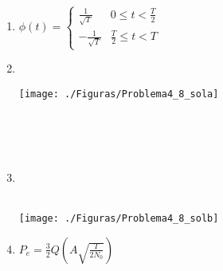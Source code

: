 \documentclass[idioma,boletin]{uah}
\begin{document}
{

\begin{enumerate}
	\item $\phi(t) = \left \{ \begin{array}{ll} \frac{1}{\sqrt{T}} & 0 \leq t < \frac{T}{2} \\  -\frac{1}{\sqrt{T}} & \frac{T}{2} \leq t < T \end{array} \right.$
	
	\item \ \\
	\begin{figure*}[h!] \centering\texttt{[image: ./Figuras/Problema4\_8\_sola]}	\end{figure*}
	\ \\
	\ \\
	\ \\
	\item \ \\
	\ \\
	\begin{figure*}[h!] 	\centering\texttt{[image: ./Figuras/Problema4\_8\_solb]} 	\end{figure*}
	
	\item $P_e = \frac{3}{2} Q \left ( A \sqrt{\frac{T}{2N_0}} \right ) $
\end{enumerate}

}
\newpage
\end{document}
